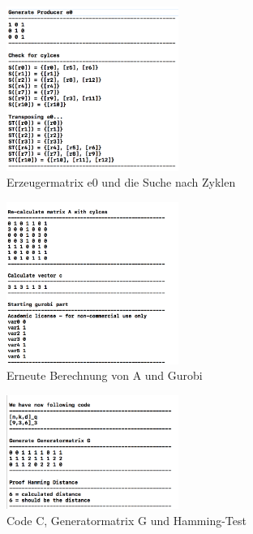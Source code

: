 \begin{figure}
	\centering
	\includegraphics[width=0.5\textwidth]{Pictures/step4_cycle_check}
	\caption{Erzeugermatrix e0 und die Suche nach Zyklen}
\end{figure}

\begin{figure}
	\centering
	\includegraphics[width=0.5\textwidth]{Pictures/step4_recalcA}
	\caption{Erneute Berechnung von A und Gurobi}
\end{figure}

\begin{figure}
	\centering
	\includegraphics[width=0.5\textwidth]{Pictures/step4_end}
	\caption{Code C, Generatormatrix G und Hamming-Test}
\end{figure}
